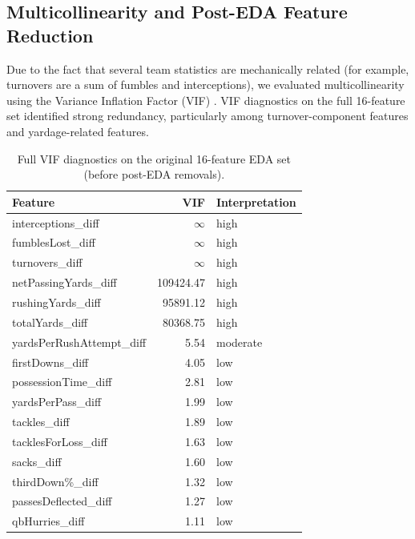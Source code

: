 \documentclass[11pt]{amsart}
\theoremstyle{definition}                  %
\theoremstyle{remark}                       %
\numberwithin{equation}{section}
\begin{document}
\subsection{Multicollinearity and Post-EDA Feature Reduction}
Due to the fact that several team statistics are mechanically related (for example, turnovers are a sum of fumbles and interceptions), we evaluated multicollinearity using the Variance Inflation Factor (VIF) \cite{belsley1980regression, james2021introduction}. VIF diagnostics on the full 16-feature set identified strong redundancy, particularly among turnover-component features and yardage-related features.

\begin{table}[h!]
\centering
\small
\begin{tabular}{lrl}
\toprule
\textbf{Feature} & \textbf{VIF} & \textbf{Interpretation} \\
\midrule
interceptions\_diff        & $\infty$     & high \\
fumblesLost\_diff          & $\infty$     & high \\
turnovers\_diff            & $\infty$     & high \\
netPassingYards\_diff      & 109424.47    & high \\
rushingYards\_diff         & 95891.12     & high \\
totalYards\_diff           & 80368.75     & high \\
yardsPerRushAttempt\_diff  & 5.54         & moderate \\
firstDowns\_diff           & 4.05         & low \\
possessionTime\_diff       & 2.81         & low \\
yardsPerPass\_diff         & 1.99         & low \\
tackles\_diff              & 1.89         & low \\
tacklesForLoss\_diff       & 1.63         & low \\
sacks\_diff                & 1.60         & low \\
thirdDown\%\_diff          & 1.32         & low \\
passesDeflected\_diff      & 1.27         & low \\
qbHurries\_diff            & 1.11         & low \\
\bottomrule
\end{tabular}
\caption{Full VIF diagnostics on the original 16-feature EDA set (before post-EDA removals).}
\label{tab:vif_full_eda}
\end{table}
\FloatBarrier
\end{document}
